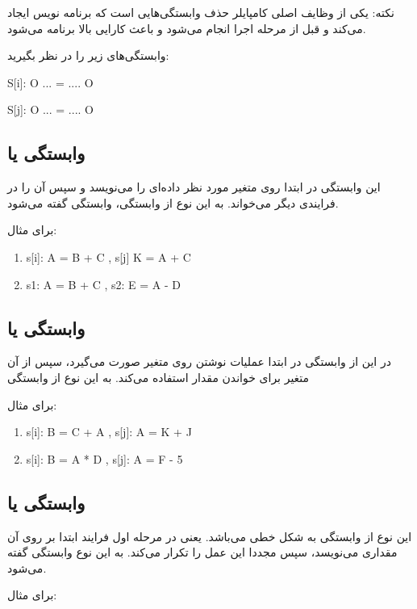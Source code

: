 \documentclass[20pt, a4paper]{article}
\begin{document}
نکته: یکی از وظایف اصلی کامپایلر حذف وابستگی‌هایی است که برنامه نویس ایجاد
می‌کند و قبل از مرحله اجرا انجام می‌شود و باعث کارایی بالا برنامه می‌شود.


وابستگی‌های زیر را در نظر بگیرید:

S[i]: O ... = .... O

S[j]: O ... = .... O

\subsection{وابستگی  یا }

این وابستگی در ابتدا روی متغیر مورد نظر داده‌ای را می‌نویسد و سپس آن را در
فرایندی دیگر می‌خواند. به این نوع از وابستگی، وابستگی  گفته
می‌شود.

برای مثال:

\begin{enumerate}
    \item s[i]: A = B + C , s[j] K = A + C
    \item s1: A = B + C , s2: E = A - D
\end{enumerate}

\subsection{وابستگی  یا }

در این از وابستگی در ابتدا عملیات نوشتن روی متغیر صورت می‌گیرد، سپس از آن متغیر
برای خواندن مقدار استفاده می‌کند. به این نوع از وابستگی 

برای مثال:

\begin{enumerate}
    \item s[i]: B = C + A , s[j]: A = K + J
    \item s[i]: B = A * D , s[j]: A = F - 5
\end{enumerate}

\subsection{وابستگی  یا }

این نوع از وابستگی به شکل خطی می‌باشد. یعنی در مرحله اول فرایند ابتدا بر روی آن
مقداری می‌نویسد، سپس مجددا این عمل را تکرار می‌کند. به این نوع وابستگی
 گفته می‌شود.

برای مثال:
\end{document}
